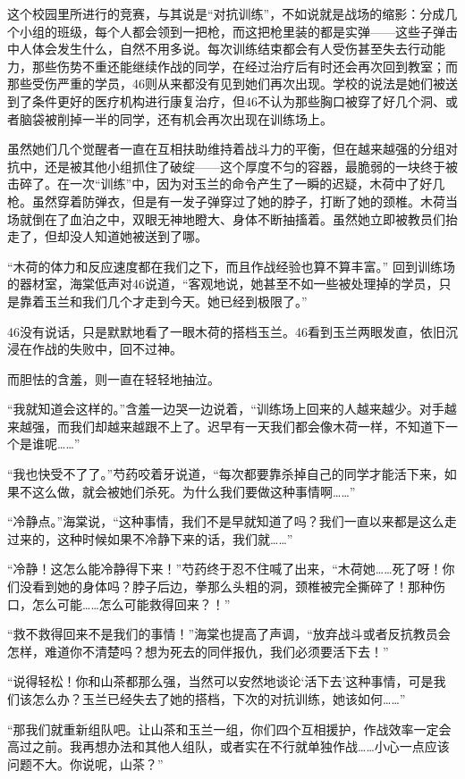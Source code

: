 这个校园里所进行的竞赛，与其说是“对抗训练”，不如说就是战场的缩影：分成几个小组的班级，每个人都会领到一把枪，而这把枪里装的都是实弹——这些子弹击中人体会发生什么，自然不用多说。每次训练结束都会有人受伤甚至失去行动能力，那些伤势不重还能继续作战的同学，在经过治疗后有时还会再次回到教室；而那些受伤严重的学员，46则从来都没有见到她们再次出现。学校的说法是她们被送到了条件更好的医疗机构进行康复治疗，但46不认为那些胸口被穿了好几个洞、或者脑袋被削掉一半的同学，还有机会再次出现在训练场上。

虽然她们几个觉醒者一直在互相扶助维持着战斗力的平衡，但在越来越强的分组对抗中，还是被其他小组抓住了破绽——这个厚度不匀的容器，最脆弱的一块终于被击碎了。在一次“训练”中，因为对玉兰的命令产生了一瞬的迟疑，木荷中了好几枪。虽然穿着防弹衣，但是有一发子弹穿过了她的脖子，打断了她的颈椎。木荷当场就倒在了血泊之中，双眼无神地瞪大、身体不断抽搐着。虽然她立即被教员们抬走了，但却没人知道她被送到了哪。

“木荷的体力和反应速度都在我们之下，而且作战经验也算不算丰富。” 回到训练场的器材室，海棠低声对46说道，“客观地说，她甚至不如一些被处理掉的学员，只是靠着玉兰和我们几个才走到今天。她已经到极限了。”

46没有说话，只是默默地看了一眼木荷的搭档玉兰。46看到玉兰两眼发直，依旧沉浸在作战的失败中，回不过神。

而胆怯的含羞，则一直在轻轻地抽泣。

“我就知道会这样的。”含羞一边哭一边说着，“训练场上回来的人越来越少。对手越来越强，而我们却越来越跟不上了。迟早有一天我们都会像木荷一样，不知道下一个是谁呢……”

“我也快受不了了。”芍药咬着牙说道，“每次都要靠杀掉自己的同学才能活下来，如果不这么做，就会被她们杀死。为什么我们要做这种事情啊……”

“冷静点。”海棠说，“这种事情，我们不是早就知道了吗？我们一直以来都是这么走过来的，这种时候如果不冷静下来的话，我们就……”

“冷静！这怎么能冷静得下来！”芍药终于忍不住喊了出来，“木荷她……死了呀！你们没看到她的身体吗？脖子后边，拳那么头粗的洞，颈椎被完全撕碎了！那种伤口，怎么可能……怎么可能救得回来？！”

“救不救得回来不是我们的事情！”海棠也提高了声调，“放弃战斗或者反抗教员会怎样，难道你不清楚吗？想为死去的同伴报仇，我们必须要活下去！”

“说得轻松！你和山茶都那么强，当然可以安然地谈论‘活下去’这种事情，可是我们该怎么办？玉兰已经失去了她的搭档，下次的对抗训练，她该如何……”

“那我们就重新组队吧。让山茶和玉兰一组，你们四个互相援护，作战效率一定会高过之前。我再想办法和其他人组队，或者实在不行就单独作战……小心一点应该问题不大。你说呢，山茶？”

